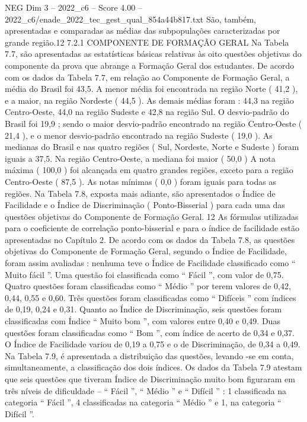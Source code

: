 \begin{textsample}{NEG Dim 3 – 2022\_c6 – Score 4.00 – 2022\_c6/enade\_2022\_tec\_gest\_qual\_854a44b817.txt}
São, também, apresentadas e comparadas as médias das subpopulações caracterizadas por grande região.12 7.2.1 COMPONENTE DE FORMAÇÃO GERAL Na Tabela 7.7, são apresentadas as estatísticas básicas relativas às oito questões objetivas do componente da prova que abrange a Formação Geral dos estudantes.
De acordo com os dados da Tabela 7.7, em relação ao Componente de Formação Geral, a média do Brasil foi 43,5.
A menor média foi encontrada na região Norte ( 41,2 ), e a maior, na região Nordeste ( 44,5 ).
As demais médias foram : 44,3 na região Centro-Oeste, 44,0 na região Sudeste e 42,8 na região Sul.
O desvio-padrão do Brasil foi 19,9 ; sendo o maior desvio-padrão encontrado na região Centro-Oeste ( 21,4 ), e o menor desvio-padrão encontrado na região Sudeste ( 19,0 ).
As medianas do Brasil e nas quatro regiões ( Sul, Nordeste, Norte e Sudeste ) foram iguais a 37,5.
Na região Centro-Oeste, a mediana foi maior ( 50,0 ) A nota máxima ( 100,0 ) foi alcançada em quatro grandes regiões, exceto para a região Centro-Oeste ( 87,5 ).
As notas mínimas ( 0,0 ) foram iguais para todas as regiões.
Na Tabela 7.8, exposta mais adiante, são apresentados o Índice de Facilidade e o Índice de Discriminação ( Ponto-Bisserial ) para cada uma das questões objetivas do Componente de Formação Geral. 12 As fórmulas utilizadas para o coeficiente de correlação ponto-bisserial e para o índice de facilidade estão apresentadas no Capítulo 2.
De acordo com os dados da Tabela 7.8, as questões objetivas do Componente de Formação Geral, segundo o Índice de Facilidade, foram assim avaliadas : nenhuma teve o Índice de Facilidade classificado como “ Muito fácil ”.
Uma questão foi classificada como “ Fácil ”, com valor de 0,75.
Quatro questões foram classificadas como “ Médio ” por terem valores de 0,42, 0,44, 0,55 e 0,60.
Três questões foram classificadas como “ Difíceis ” com índices de 0,19, 0,24 e 0,31.
Quanto ao Índice de Discriminação, seis questões foram classificadas com Índice “ Muito bom ”, com valores entre 0,40 e 0,49.
Duas questões foram classificadas como “ Bom ”, com índice de acerto de 0,34 e 0,37.
O Índice de Facilidade variou de 0,19 a 0,75 e o de Discriminação, de 0,34 a 0,49.
Na Tabela 7.9, é apresentada a distribuição das questões, levando -se em conta, simultaneamente, a classificação dos dois índices.
Os dados da Tabela 7.9 atestam que seis questões que tiveram Índice de Discriminação muito bom figuraram em três níveis de dificuldade – “ Fácil ”, “ Médio ” e “ Difícil ” : 1 classificada na categoria “ Fácil ”, 4 classificadas na categoria “ Médio ” e 1, na categoria “ Difícil ”.

\end{textsample}
